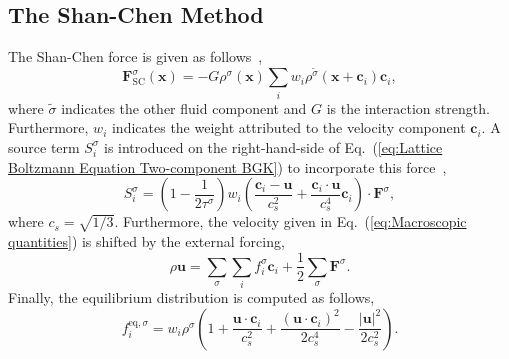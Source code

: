 \documentclass[aps,physrev,twocolumn,10pt]{revtex4-2}
\begin{document}
\subsection{\label{sec:The Shan-Chen Method}The Shan-Chen Method}
The Shan-Chen force is given as follows~\cite{shan_lattice_1993},
\begin{equation}\label{eq:Shan-Chen force}
    \bm{F}_{\text{SC}}^\sigma(\bm{x}) = -G \rho^\sigma(\bm{x})\sum_i w_i\rho^{\tilde{\sigma}}\left(\bm{x}+\bm{c}_i\right)\bm{c}_i,
\end{equation}
where $\tilde{\sigma}$ indicates the other fluid component and $G$ is the interaction strength. Furthermore, $w_i$ indicates the weight attributed to the velocity component $\bm{c}_i$. A source term $S^\sigma_i$ is introduced on the right-hand-side of Eq.~(\ref{eq:Lattice Boltzmann Equation Two-component BGK}) to incorporate this force~\cite{guo_discrete_2002},
\begin{equation}
    S_i^\sigma = \left(1 - \frac{1}{2\tau^\sigma}\right)w_i \left(\frac{\bm{c}_i - \bm{u}}{c_s^2} + \frac{\bm{c}_i \cdot \bm{u}}{c_s^4}\bm{c}_i\right) \cdot \bm{F}^\sigma,
\end{equation}
where $c_s = \sqrt{1/3}$. Furthermore, the velocity given in Eq.~(\ref{eq:Macroscopic quantities}) is shifted by the external forcing,
\begin{equation}
    \rho \bm{u} = \sum_\sigma\sum_i f_i^\sigma \bm{c}_i + \frac{1}{2} \sum_\sigma\bm{F}^\sigma.
\end{equation}
Finally, the equilibrium distribution is computed as follows,
\begin{equation}\label{eq:Equilibrium distribution Shan-Chen}
    f^{\text{eq},\sigma}_i = w_i \rho^\sigma \left(1 + \frac{\bm{u} \cdot \bm{c}_i}{c_s^2} + \frac{{\left(\bm{u} \cdot \bm{c}_i\right)}^2}{2c_s^4} - \frac{|\bm{u}|^2}{2c_s^2}\right).
\end{equation}
\end{document}
